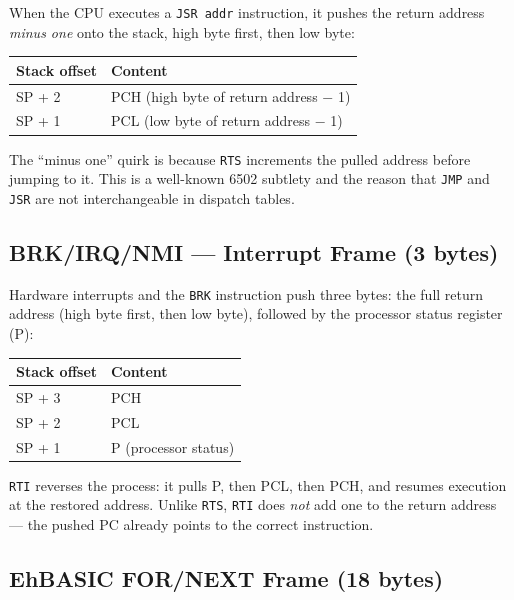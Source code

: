 When the CPU executes a \texttt{JSR addr} instruction, it pushes the return
address \emph{minus one} onto the stack, high byte first, then low byte:

\begin{center}
\begin{tabular}{@{}ll@{}}
\toprule
\textbf{Stack offset} & \textbf{Content} \\
\midrule
SP + 2 & PCH (high byte of return address $-$ 1) \\
SP + 1 & PCL (low byte of return address $-$ 1) \\
\bottomrule
\end{tabular}
\end{center}

The ``minus one'' quirk is because \texttt{RTS} increments the pulled address
before jumping to it.  This is a well-known 6502 subtlety and the reason that
\texttt{JMP} and \texttt{JSR} are not interchangeable in dispatch tables.

\subsection{BRK/IRQ/NMI --- Interrupt Frame (3 bytes)}

Hardware interrupts and the \texttt{BRK} instruction push three bytes: the full
return address (high byte first, then low byte), followed by the processor
status register (P):

\begin{center}
\begin{tabular}{@{}ll@{}}
\toprule
\textbf{Stack offset} & \textbf{Content} \\
\midrule
SP + 3 & PCH \\
SP + 2 & PCL \\
SP + 1 & P (processor status) \\
\bottomrule
\end{tabular}
\end{center}

\texttt{RTI} reverses the process: it pulls P, then PCL, then PCH, and resumes
execution at the restored address.  Unlike \texttt{RTS}, \texttt{RTI} does
\emph{not} add one to the return address --- the pushed PC already points to
the correct instruction.

\subsection{EhBASIC FOR/NEXT Frame (\raisebox{0pt}{\texttildelow}18 bytes)}


